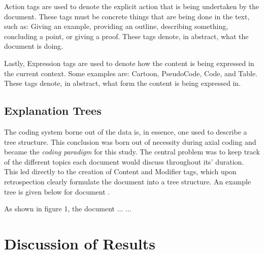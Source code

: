 \documentclass[sigconf]{acmart}
\begin{document}
Action tags are used to denote the explicit action that is being undertaken by
the document. These tags must be concrete things that are being done in the
text, such as: Giving an example, providing an outline, describing something,
concluding a point, or giving a proof. These tags denote, in abstract, what the
document is doing.

Lastly, Expression tags are used to denote how the content is being expressed in
the current context. Some examples are: Cartoon, PseudoCode, Code, and Table.
These tags denote, in abstract, what form the content is being expressed in.

\subsection{Explanation Trees}
\label{sec:res:xopTree}
The coding system borne out of the data is, in essence, one used to describe a
tree structure. This conclusion was born out of necessity during axial coding
and became the \emph{coding paradigm} for this study. The central problem was to
keep track of the different topics each document would discuss throughout its'
duration. This led directly to the creation of Content and Modifier tags, which
upon retrospection clearly formulate the document into a tree structure. An
example tree is given below for document .



As shown in figure 1, the document ... ... 


\section{Discussion of Results}





\end{document}
